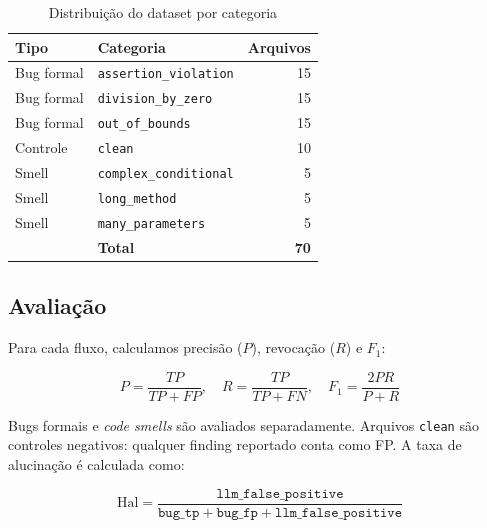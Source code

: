 \documentclass[conference]{IEEEtran}
\begin{document}
\begin{table}[htbp]
  \caption{Distribuição do dataset por categoria}
  \label{tab:dataset}
  \begin{center}
    \begin{tabular}{llr}
      \toprule
      \textbf{Tipo} & \textbf{Categoria} & \textbf{Arquivos} \\
      \midrule
      Bug formal & \texttt{assertion\_violation}  & 15 \\
      Bug formal & \texttt{division\_by\_zero}    & 15 \\
      Bug formal & \texttt{out\_of\_bounds}       & 15 \\
      Controle   & \texttt{clean}                 & 10 \\
      Smell      & \texttt{complex\_conditional}  & 5  \\
      Smell      & \texttt{long\_method}          & 5  \\
      Smell      & \texttt{many\_parameters}      & 5  \\
      \midrule
                 & \textbf{Total}                 & \textbf{70} \\
      \bottomrule
    \end{tabular}
  \end{center}
\end{table}

\subsection{Avaliação}
\label{sec:avaliacao}

Para cada fluxo, calculamos precisão ($P$), revocação ($R$) e $F_1$:

\begin{equation}
  P = \frac{TP}{TP + FP}, \quad
  R = \frac{TP}{TP + FN}, \quad
  F_1 = \frac{2PR}{P + R}
  \label{eq:prf}
\end{equation}

Bugs formais e \textit{code smells} são avaliados separadamente.
Arquivos \texttt{clean} são controles negativos: qualquer finding
reportado conta como FP.
A taxa de alucinação é calculada como:

\begin{equation}
  \text{Hal} = \frac{\texttt{llm\_false\_positive}}
               {\texttt{bug\_tp} + \texttt{bug\_fp} +
                \texttt{llm\_false\_positive}}
  \label{eq:hal}
\end{equation}

\end{document}
